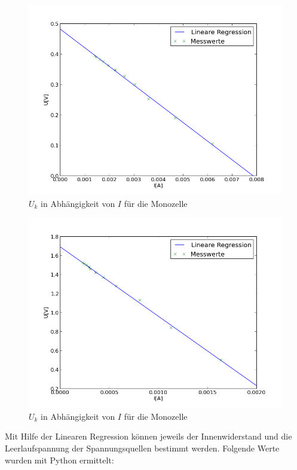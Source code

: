 \documentclass[11pt]{article}
\begin{document}
\begin{figure}
\centering
\includegraphics[scale=1.00]{Plot2.png}
\caption{$U_k$ in Abh\"angigkeit von $I$ f\"ur die Monozelle}
\label{Plot2}
\end{figure}
\begin{figure}
\centering
\includegraphics[scale=1.00]{Plot3.png}
\caption{$U_k$ in Abh\"angigkeit von $I$ f\"ur die Monozelle}
\label{Plot3}
\end{figure}
\newpage
\noindent
Mit Hilfe der Linearen Regression können jeweils der Innenwiderstand und die Leerlaufspannung der Spannungsquellen bestimmt werden. Folgende Werte wurden mit Python ermittelt:
\end{document}
